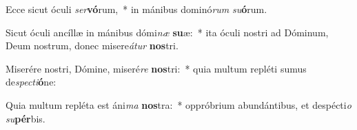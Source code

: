 \item Ecce sicut óculi \textit{ser}\textbf{vó}rum,~* in mánibus dominó\textit{rum} \textit{su}\textbf{ó}rum.
\item Sicut óculi ancíllæ in mánibus dómi\textit{næ} \textbf{su}æ:~* ita óculi nostri ad Dóminum, Deum nostrum, donec misere\textit{á}\textit{tur} \textbf{nos}tri.
\item Miserére nostri, Dómine, miseré\textit{re} \textbf{nos}tri:~* quia multum repléti sumus de\textit{spec}\textit{ti}\textbf{ó}ne:
\item Quia multum repléta est áni\textit{ma} \textbf{nos}tra:~* oppróbrium abundántibus, et despécti\textit{o} \textit{su}\textbf{pér}bis.

